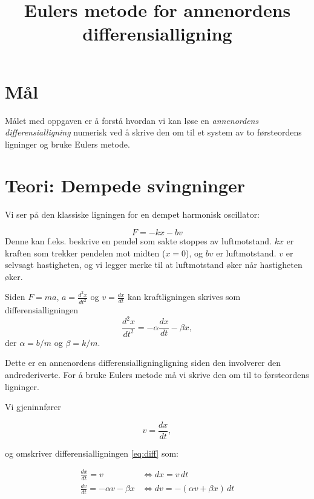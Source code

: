 \documentclass[a4paper,12pt]{article}
\title{Eulers metode for annenordens differensialligning}
\author{}
\date{}
\begin{document}
\maketitle

\section*{Mål}

Målet med oppgaven er å forstå hvordan vi kan løse en \textit{annenordens differensialligning} numerisk ved å skrive den om til et system av to førsteordens ligninger og bruke Eulers metode.

\section*{Teori: Dempede svingninger}

Vi ser på den klassiske ligningen for en dempet harmonisk oscillator:

\begin{equation}
F = -kx - bv
\end{equation}
Denne kan f.eks. beskrive en pendel som sakte stoppes av luftmotstand. $kx$ er kraften som trekker pendelen mot midten ($x=0$), og $bv$ er luftmotstand. $v$ er selvsagt hastigheten, og vi legger merke til at luftmotstand øker når hastigheten øker.

Siden $F=ma$, $a=\frac{d^2x}{dt^2}$ og $v=\frac{dx}{dt}$ kan kraftligningen skrives som differensialligningen
\begin{equation}
\label{eq:diff}
\frac{d^2x}{dt^2} =- \alpha \frac{dx}{dt} - \beta x,
\end{equation}
der $\alpha=b/m$ og $\beta=k/m$.

Dette er en annenordens differensialligningligning siden den involverer den andrederiverte. For å bruke Eulers metode må vi skrive den om til to førsteordens ligninger.

Vi gjeninnfører

\[
v = \frac{dx}{dt},
\]

og omskriver differensialligningen \eqref{eq:diff} som:

\begin{subequations}
\begin{align}
\frac{dx}{dt} = v &\iff dx = v \, dt \label{eq:dx}\\
\frac{dv}{dt} = -\alpha v - \beta x &\iff dv = -(\alpha v +\beta x) \, dt \label{eq:dv}
\end{align}
\end{subequations}
\end{document}
